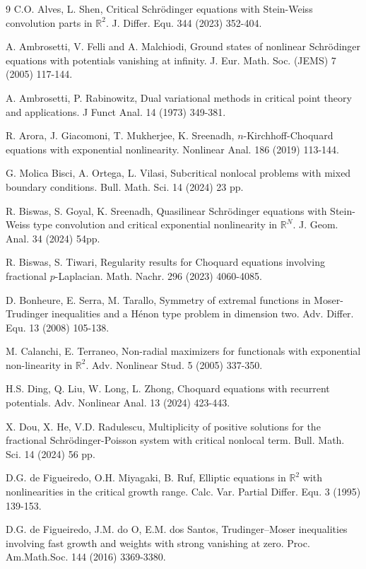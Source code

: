 \documentclass[11pt]{amsart}
\numberwithin{equation}{section}
\newcommand{\R}{\mathbb{R}}
\newcommand{\1}{\frac{1}{2}}
\begin{document}
\begin{thebibliography}{9}
		 C.O. Alves, L. Shen, Critical Schr\"{o}dinger equations with Stein-Weiss convolution parts in $\R^2$. J. Differ. Equ. 344 (2023) 352-404.
		
		 A. Ambrosetti, V. Felli and A. Malchiodi, Ground states of nonlinear Schr\"{o}dinger equations with potentials vanishing at infinity. J. Eur. Math. Soc. (JEMS) 7 (2005) 117-144.
		
		 A. Ambrosetti, P. Rabinowitz, Dual variational methods in critical point theory and applications. J Funct Anal. 14 (1973) 349-381.
		
		 R. Arora, J. Giacomoni, T. Mukherjee, K. Sreenadh, $n$-Kirchhoff-Choquard equations with exponential nonlinearity. Nonlinear Anal. 186 (2019) 113-144.
		
		 G. Molica Bisci, A. Ortega, L. Vilasi, Subcritical nonlocal problems with mixed boundary conditions. Bull. Math. Sci. 14 (2024) 23 pp.
		
		 R. Biswas, S. Goyal, K. Sreenadh, Quasilinear Schr\"odinger equations with Stein-Weiss type convolution and critical exponential nonlinearity in $\R^N$. J. Geom. Anal. 34 (2024) 54pp.
		
		 R. Biswas, S. Tiwari, Regularity results for Choquard equations involving fractional $p$-Laplacian. Math. Nachr. 296 (2023) 4060-4085.
		
		 D. Bonheure, E. Serra, M. Tarallo, Symmetry of extremal functions in Moser-Trudinger inequalities and a H\'enon type problem in dimension two. Adv. Differ. Equ. 13 (2008) 105-138.
		
		 M. Calanchi, E. Terraneo, Non-radial maximizers for functionals with exponential non-linearity in $\R^2$. Adv. Nonlinear Stud. 5 (2005) 337-350. 
		
		 H.S. Ding, Q. Liu, W. Long, L. Zhong, Choquard equations with recurrent potentials. Adv. Nonlinear Anal. 13 (2024) 423-443.
		
		 X. Dou, X. He, V.D. Radulescu, Multiplicity of positive solutions for the fractional Schrödinger-Poisson system with critical nonlocal term. Bull. Math. Sci. 14 (2024) 56 pp.
		
		 D.G. de Figueiredo, O.H. Miyagaki, B. Ruf, Elliptic equations in $\R^2$ with nonlinearities in the critical growth range. Calc. Var. Partial Differ. Equ. 3 (1995) 139-153.
		
		 D.G. de Figueiredo, J.M. do O,  E.M. dos Santos, Trudinger–Moser inequalities involving fast growth and weights with strong vanishing at zero. Proc. Am.Math.Soc. 144 (2016) 3369-3380.
		

\end{thebibliography}
\end{document}
